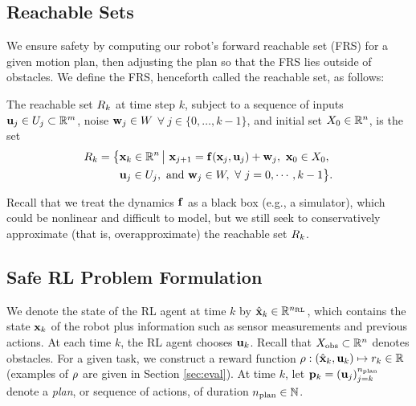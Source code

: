 \subsection{Reachable Sets}\label{subsec:reachable_sets_defn}
We ensure safety by computing our robot's forward reachable set (FRS) for a given motion plan, then adjusting the plan so that the FRS lies outside of obstacles.
We define the FRS, henceforth called the reachable set, as follows:
\begin{definition} 
The reachable set $R_{k}$ at time step $k$, subject to a sequence of inputs ${\mathbf{u}}_{j} \in U_{j} \subset \mathbb{R}^m$, noise ${\mathbf{w}}_{j} \in W$ $\forall\ j \in \{ 0, \dots, k-1\}$, and initial set $X_{0} \in  \mathbb{R}^n$, is the set
\begin{align}\begin{split}\label{eq:reachable_set_k}
        \reachset_{k} = \big\{&\vcstate_{k} \in \mathbb{R}^n \, \big|\ 
            \vcstate_{j+1} = \dyn(\vcstate_{j}, \action_{j}) + \noise_{j},\ \vcstate_{0} \in \statespace_{0},\\ &\action_{j} \in \actionspace_{j},\ \regtext{and}\ \noise_{j} \in \noisespace,\  \forall\ j = 0,\cdots,k-1\big\}.
\end{split}\end{align}
\end{definition}

Recall that we treat the dynamics ${\mathbf{f}}$ as a black box (e.g., a simulator), which could be nonlinear and difficult to model, but we still seek to conservatively approximate (that is, overapproximate) the reachable set $R_k$.




\subsection{Safe RL Problem Formulation}
We denote the state of the RL agent at time $k$ by  $\hat{{\mathbf{x}}}_{k} \in {\mathbb{R}}^{n_{\mathrm{\textnormal{RL}}}}$, which contains the state ${\mathbf{x}}_k$ of the robot plus information such as sensor measurements and previous actions.
At each time $k$, the RL agent chooses ${\mathbf{u}}_{k}$.
Recall that $X_{\mathrm{\textnormal{obs}}} \subset {\mathbb{R}}^n$ denotes obstacles.
For a given task, we construct a reward function $\rho: (\hat{{\mathbf{x}}}_{k},{\mathbf{u}}_k) \mapsto r_{k} \in {\mathbb{R}}$ (examples of $\rho$ are given in Section \ref{sec:eval}).
At time $k$, let ${\mathbf{p}}_k = ({\mathbf{u}}_j)_{j=k}^{n_{\mathrm{\textnormal{plan}}}}$ denote a \emph{plan}, or sequence of actions, of duration ${n_{\mathrm{\textnormal{plan}}}} \in {\mathbb{N}}$.

